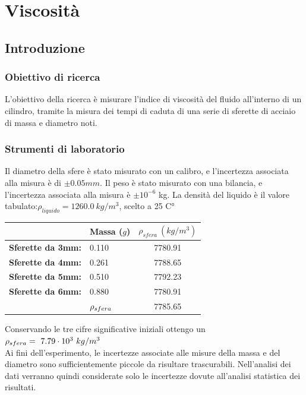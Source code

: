 \chapter{Viscosità}
\section{Introduzione}
\subsection{Obiettivo di ricerca}
L'obiettivo della ricerca è misurare l'indice di viscosità del fluido all'interno di un cilindro, tramite la misura dei tempi di caduta di una serie di sferette di acciaio di massa e diametro noti. 
\subsection{Strumenti di laboratorio}

Il diametro della sfere è stato misurato con un calibro, e l'incertezza associata alla misura è di $\pm0.05 mm$. Il peso è stato misurato con una bilancia, e l'incertezza associata alla misura è  $\pm10^{-6}$ kg.
La densità del liquido è il valore tabulato:$\rho_{liquido} =  1260.0\  kg/m^3 $, scelto a 25 C°
\begin{center}
\begin{tabular}{ll |c}
& Massa ($g$)& $\rho_{sfera} \ (kg/m^3)$\\
\midrule
 \textbf{Sferette da 3mm:}
 & 0.110 & 7780.91 \\
 \midrule
\textbf{Sferette da 4mm: }
 & 0.261 & 7788.65\\
 \midrule
\textbf{Sferette da 5mm: }
 & 0.510 & 7792.23 \\
 \midrule
 \textbf{Sferette da 6mm:}
  & 0.880 & 7780.91\\
  \midrule
  & $\-{\rho_{sfera}}$& 7785.65\\
\end{tabular}
\end{center}
Conservando le tre cifre significative iniziali ottengo un $\-{\rho_{sfera}} = \ 7.79 \cdot 10^3 \ kg/m^3$
\\

Ai fini dell'esperimento, le incertezze associate alle misure della massa e del diametro sono sufficientemente piccole da risultare trascurabili. Nell'analisi dei dati verranno quindi considerate solo le incertezze dovute all'analisi statistica dei risultati. 
\\

